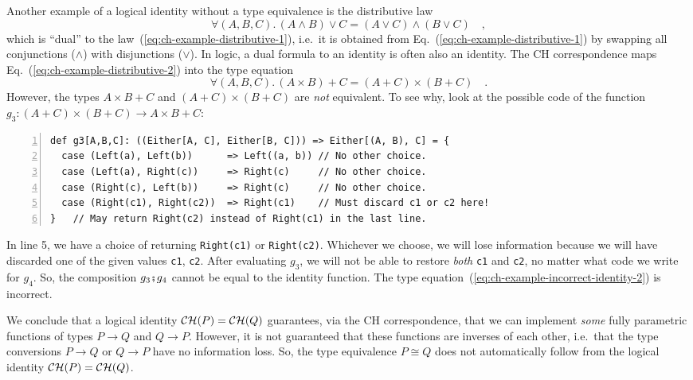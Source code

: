 Another example of a logical identity without a type equivalence is
the distributive law 
\begin{equation}
\forall(A,B,C).\,\left(A\wedge B\right)\vee C=\left(A\vee C\right)\wedge\left(B\vee C\right)\quad,\label{eq:ch-example-distributive-2}
\end{equation}
which is \textsf{``}dual\textsf{''} to the law~(\ref{eq:ch-example-distributive-1}),
i.e.~it is obtained from Eq.~(\ref{eq:ch-example-distributive-1})
by swapping all conjunctions ($\wedge$) with disjunctions ($\vee$).
In logic, a dual formula to an identity is often also an identity.
The CH correspondence maps Eq.~(\ref{eq:ch-example-distributive-2})
into the type equation
\begin{equation}
\forall(A,B,C).\,\left(A\times B\right)+C=\left(A+C\right)\times\left(B+C\right)\quad.\label{eq:ch-example-incorrect-identity-2}
\end{equation}
However, the types $A\times B+C$ and $\left(A+C\right)\times\left(B+C\right)$
are \emph{not} equivalent. To see why, look at the possible code of
the function $g_{3}:\left(A+C\right)\times\left(B+C\right)\rightarrow A\times B+C$:
\begin{lstlisting}[numbers=left]
def g3[A,B,C]: ((Either[A, C], Either[B, C])) => Either[(A, B), C] = {
  case (Left(a), Left(b))      => Left((a, b)) // No other choice.
  case (Left(a), Right(c))     => Right(c)     // No other choice.
  case (Right(c), Left(b))     => Right(c)     // No other choice.
  case (Right(c1), Right(c2))  => Right(c1)    // Must discard c1 or c2 here!
}   // May return Right(c2) instead of Right(c1) in the last line.
\end{lstlisting}
In line 5, we have a choice of returning \lstinline!Right(c1)! or
\lstinline!Right(c2)!. Whichever we choose, we will lose information
because we will have discarded one of the given values \lstinline!c1!,
\lstinline!c2!. After evaluating $g_{3}$, we will not be able to
restore \emph{both} \lstinline!c1! and \lstinline!c2!, no matter
what code we write for $g_{4}$. So, the composition $g_{3}\bef g_{4}$
cannot be equal to the identity function. The type equation~(\ref{eq:ch-example-incorrect-identity-2})
is incorrect.

We conclude that a logical identity ${\cal CH}(P)={\cal CH}(Q)$ guarantees,
via the CH correspondence, that we can implement \emph{some} fully
parametric functions of types $P\rightarrow Q$ and $Q\rightarrow P$.
However, it is not guaranteed that these functions are inverses of
each other, i.e.~that the type conversions $P\rightarrow Q$ or $Q\rightarrow P$
have no information loss. So, the type equivalence
$P\cong Q$ does not automatically follow from the logical identity
${\cal CH}(P)={\cal CH}(Q)$.

